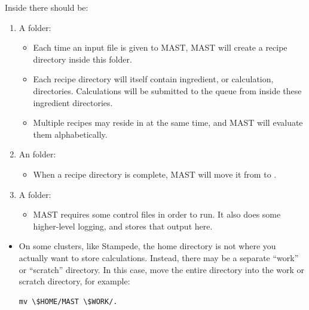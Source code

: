 \documentclass[letterpaper,10pt,english]{sphinxmanual}
\begin{document}
Inside  there should be:
\begin{enumerate}
\item {} 
A  folder:
\begin{itemize}
\item {} 
Each time an input file is given to MAST, MAST will create a recipe directory inside this folder.

\item {} 
Each recipe directory will itself contain ingredient, or calculation, directories. Calculations will be submitted to the queue from inside these ingredient directories.

\item {} 
Multiple recipes may reside in  at the same time, and MAST will evaluate them alphabetically.

\end{itemize}

\item {} 
An  folder:
\begin{itemize}
\item {} 
When a recipe directory is complete, MAST will move it from  to .

\end{itemize}

\item {} 
A  folder:
\begin{itemize}
\item {} 
MAST requires some control files in order to run. It also does some higher-level logging, and stores that output here.

\end{itemize}

\end{enumerate}
\begin{itemize}
\item {} 
On some clusters, like Stampede, the home directory is not where you actually want to store calculations. Instead, there may be a separate ``work'' or ``scratch'' directory. In this case, move the entire  directory into the work or scratch directory, for example:

\begin{Verbatim}[commandchars=\\\{\}]
mv \$HOME/MAST \$WORK/.
\end{Verbatim}

\end{itemize}
\end{document}

